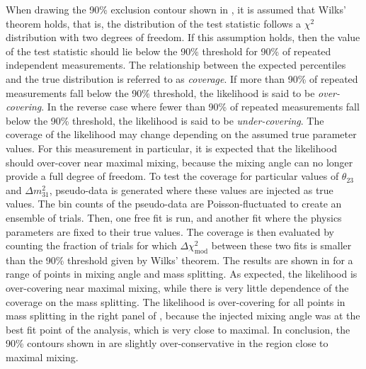 When drawing the 90\% exclusion contour shown in , it is assumed that Wilks' theorem holds, that is, the distribution of the test statistic follows a $\chi^2$ distribution with two degrees of freedom. If this assumption holds, then the value of the test statistic should lie below the 90\% threshold for 90\% of repeated independent measurements. The relationship between the expected percentiles and the true distribution is referred to as \emph{coverage}. If more than 90\% of repeated measurements fall below the 90\% threshold, the likelihood is said to be \emph{over-covering}. In the reverse case where fewer than 90\% of repeated measurements fall below the 90\% threshold, the likelihood is said to be \emph{under-covering}. The coverage of the likelihood may change depending on the assumed true parameter values. For this measurement in particular, it is expected that the likelihood should over-cover near maximal mixing, because the mixing angle can no longer provide a full degree of freedom. To test the coverage for particular values of $\theta_{23}$ and $\Delta m^2_{31}$, pseudo-data is generated where these values are injected as true values. The bin counts of the pseudo-data are Poisson-fluctuated to create an ensemble of trials. Then, one free fit is run, and another fit where the physics parameters are fixed to their true values. The coverage is then evaluated by counting the fraction of trials for which $\Delta \chi^2_{\mathrm{mod}}$ between these two fits is smaller than the 90\% threshold given by Wilks' theorem. The results are shown in  for a range of points in mixing angle and mass splitting. As expected, the likelihood is over-covering near maximal mixing, while there is very little dependence of the coverage on the mass splitting. The likelihood is over-covering for all points in mass splitting in the right panel of , because the injected mixing angle was at the best fit point of the analysis, which is very close to maximal. In conclusion, the 90\% contours shown in  are slightly over-conservative in the region close to maximal mixing.

